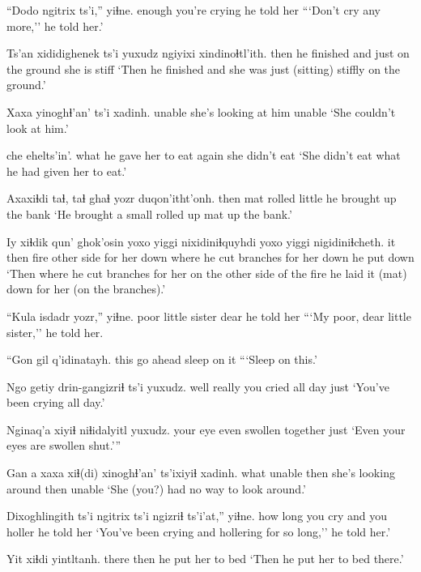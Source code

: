 \documentclass[12pt]{article}
\begin{document}
\gll ``Dodo   ngitrix ts'i,'' yiɬne.
enough {you're crying} {} {he told her}
\glt ```Don't cry any more,'' he told her.'
\glend

\gll Ts'an xididighenek ts'i yuxudz ngiyixi xindinoɬtl'ith.
then  {he finished}  and  just {on the ground} {she is stiff}
\glt `Then he finished and she was just (sitting) stiffly on the ground.'
\glend

\gll Xaxa yinoghɬ'an' ts'i xadinh.
unable   {she's looking at him} {} unable
\glt `She couldn't look at him.'
\glend

    che   {ehelts'in'.}
{what he gave her to eat} again {she didn't eat}
\glt `She didn't eat what he had given her to eat.'
\glend

\gll Axaxiɬdi taɬ, taɬ ghaɬ   yozr   duqon'itht'onh.
then     mat  {}  rolled little {he brought up the bank}
\glt `He brought a small rolled up mat up the bank.'
\glend

\gll Iy xiɬdik qun' ghok'osin  yoxo    yiggi  nixidiniɬquyhdi yoxo    yiggi nigidiniɬcheth.
it then   fire {other side} {for her} down {where he cut branches} {for her} down {he put down}
\glt `Then where he cut branches for her on the other side of the fire he laid it (mat) down for her (on the branches).'
\glend

\gll ``Kula isdadr        yozr,'' yiɬne.
poor {little sister} dear {he told her}
\glt ```My poor, dear little sister,'' he told her.
\glend

\gll ``Gon  gil      q'idinatayh.
this {go ahead} {sleep on it}
\glt ```Sleep on this.'
\glend

\gll Ngo  getiy  drin-gangizriɬ  ts'i           yuxudz.
well really {you cried all day} {} just
\glt `You've been crying all day.'
\glend

\gll Nginaq'a xiyiɬ niɬidalyitl       yuxudz. 
{your eye} even  {swollen together} just
\glt `Even your eyes are swollen shut.'''
\glend

\gll Gan a xaxa xiɬ(di) xinoghɬ'an' ts'ixiyiɬ xadinh.
what {} unable then {she's looking around} then unable
\glt `She (you?) had no way to look around.'
\glend

\gll Dixoghlingith ts'i ngitrix ts'i ngizriɬ ts'i'at,'' yiɬne.
{how long}    {}   {you cry} and  {you holler} {}  {he told her}
\glt `You've been crying and hollering for so long,'' he told her.'
\glend

\gll Yit   xiɬdi yintltanh.        
there then  {he put her to bed} 
\glt `Then he put her to bed there.'
\glend
\end{document}

